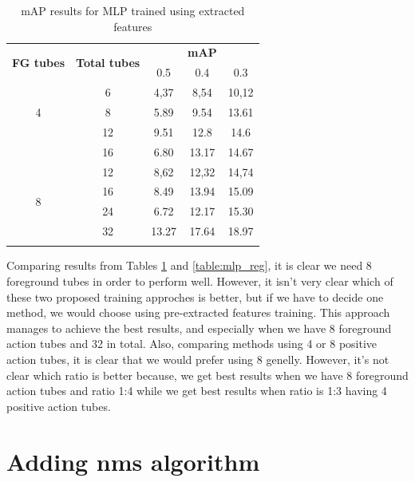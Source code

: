 \documentclass{report}
\begin{document}
\begin{center}
  \begin{longtable}{|| c | c || c c c ||}
    \hline
    \multirow{2}{*}{\textbf{FG tubes}} & \multirow{2}{*}{\textbf{Total tubes}} & {} & \textbf{mAP} & {} \\
    {} & {} & 0.5 & 0.4 & 0.3 \\
    \hline
    \multirow{3}{*}{4} & 6 & 4,37 & 8,54 & 10,12 \\
    \cline{2-5}
    {} & 8 & 5.89 & 9.54 & 13.61 \\
    \cline{2-5}
    {} & 12 & 9.51 & 12.8 & 14.6  \\
    \cline{2-5}
    {} & 16 & 6.80 & 13.17 & 14.67 \\
    \hline
    \multirow{4}{*}{8} & 12 & 8,62 & 12,32 & 14,74 \\
    \cline{2-5}
    {} & 16 & 8.49 & 13.94 & 15.09 \\
    \cline{2-5}
    {} & 24 & 6.72 & 12.17 & 15.30 \\
    \cline{2-5}
    {} & 32 & 13.27 & 17.64 & 18.97 \\
    \hline

  \caption{mAP results for MLP trained using extracted features}
  \label{table:mlp_extract_jhdmb}
\end{longtable}
\end{center}

Comparing results from Tables  \ref{table:mlp_extract_jhdmb}  and \ref{table:mlp_reg}, it is clear we need 8 foreground tubes in order to perform well. However, it isn't very
clear which of these two proposed training approches is better, but if we have to decide one method, we would choose using pre-extracted features training.  This approach manages
to achieve the best results, and especially when we have 8 foreground action tubes and 32 in total. Also, comparing methods using 4 or 8 positive action tubes, it is clear that we
would prefer using 8 genelly. However, it's not clear which ratio is better because, we get best results when we have 8 foreground action tubes  and  ratio 1:4 while we get best results
when ratio is 1:3 having 4 positive action tubes.

\section{Adding nms algorithm}
\end{document}
